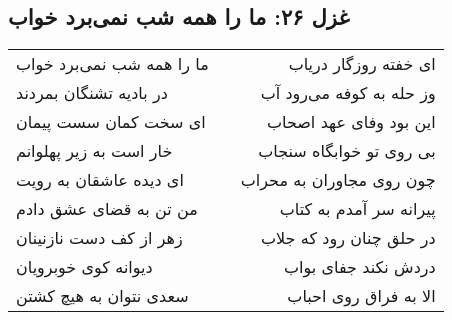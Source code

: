 \begin{center}
\section*{غزل ۲۶: ما را همه شب نمی‌برد خواب}
\label{sec:026}
\begin{longtable}{l p{0.5cm} r}
ما را همه شب نمی‌برد خواب
&&
ای خفته روزگار دریاب
\\
در بادیه تشنگان بمردند
&&
وز حله به کوفه می‌رود آب
\\
ای سخت کمان سست پیمان
&&
این بود وفای عهد اصحاب
\\
خار است به زیر پهلوانم
&&
بی روی تو خوابگاه سنجاب
\\
ای دیده عاشقان به رویت
&&
چون روی مجاوران به محراب
\\
من تن به قضای عشق دادم
&&
پیرانه سر آمدم به کتاب
\\
زهر از کف دست نازنینان
&&
در حلق چنان رود که جلاب
\\
دیوانه کوی خوبرویان
&&
دردش نکند جفای بواب
\\
سعدی نتوان به هیچ کشتن
&&
الا به فراق روی احباب
\\
\end{longtable}
\end{center}
